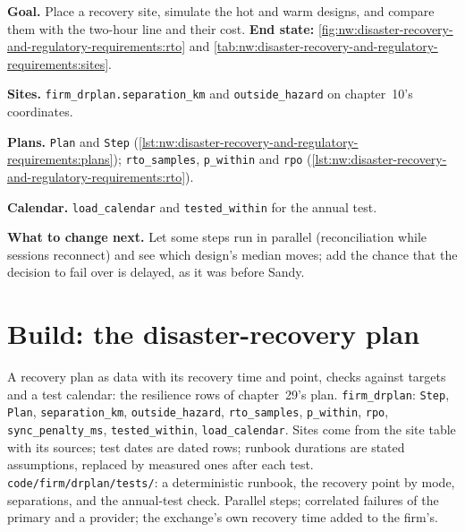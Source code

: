 \begin{tutorial}
\textbf{Goal.} Place a recovery site, simulate the hot and warm designs, and compare them with the two-hour line and their cost.
\textbf{End state:} \cref{fig:nw:disaster-recovery-and-regulatory-requirements:rto} and
\cref{tab:nw:disaster-recovery-and-regulatory-requirements:sites}.
\begin{tutsteps}
\item \textbf{Sites.} \texttt{firm\_drplan.separation\_km} and \texttt{outside\_hazard} on chapter~10's coordinates.
\item \textbf{Plans.} \texttt{Plan} and \texttt{Step} (\cref{lst:nw:disaster-recovery-and-regulatory-requirements:plans});
  \texttt{rto\_samples}, \texttt{p\_within} and \texttt{rpo} (\cref{lst:nw:disaster-recovery-and-regulatory-requirements:rto}).
\item \textbf{Calendar.} \texttt{load\_calendar} and \texttt{tested\_within} for the annual test.
\end{tutsteps}
\textbf{What to change next.} Let some steps run in parallel (reconciliation while sessions reconnect) and see which design's median
moves; add the chance that the decision to fail over is delayed, as it was before Sandy.
\end{tutorial}

\section{Build: the disaster-recovery plan}\label{bld:nw:disaster-recovery-and-regulatory-requirements:drplan}

\begin{build}
 A recovery plan as data with its recovery time and point, checks against targets and a test calendar: the resilience
rows of chapter~29's plan.
 \texttt{firm\_drplan}: \texttt{Step}, \texttt{Plan}, \texttt{separation\_km}, \texttt{outside\_hazard},
\texttt{rto\_samples}, \texttt{p\_within}, \texttt{rpo}, \texttt{sync\_penalty\_ms}, \texttt{tested\_within}, \texttt{load\_calendar}.
 Sites come from the site table with its sources; test dates are dated rows; runbook durations are stated assumptions,
replaced by measured ones after each test.
 \texttt{code/firm/drplan/tests/}: a deterministic runbook, the recovery point by mode, separations, and the
annual-test check.
 Parallel steps; correlated failures of the primary and a provider; the exchange's own recovery time added to the firm's.
\end{build}

